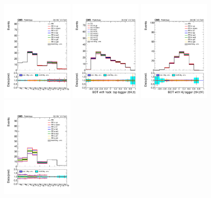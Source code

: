 \begin{figure}[htb]
        \centering 
        \includegraphics[width=0.32\textwidth]{ch10_figs/2lep_mu_catIndex.pdf}
        \includegraphics[width=0.32\textwidth]{ch10_figs/kinMVA_2lss_mu_ttbar_withBDTv8.pdf}
        \includegraphics[width=0.32\textwidth]{ch10_figs/kinMVA_2lss_mu_ttV_withHj.pdf}\\
        \includegraphics[width=0.32\textwidth]{ch10_figs/2lep_e_catIndex.pdf}

\end{figure}
